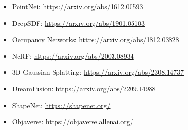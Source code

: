 \documentclass[a4paper]{article}
\begin{document}
\begin{itemize}
    \item PointNet: \url{https://arxiv.org/abs/1612.00593}
    \item DeepSDF: \url{https://arxiv.org/abs/1901.05103}
    \item Occupancy Networks: \url{https://arxiv.org/abs/1812.03828}
    \item NeRF: \url{https://arxiv.org/abs/2003.08934}
    \item 3D Gaussian Splatting: \url{https://arxiv.org/abs/2308.14737}
    \item DreamFusion: \url{https://arxiv.org/abs/2209.14988}
    \item ShapeNet: \url{https://shapenet.org/}
    \item Objaverse: \url{https://objaverse.allenai.org/}
\end{itemize}
\end{document}
